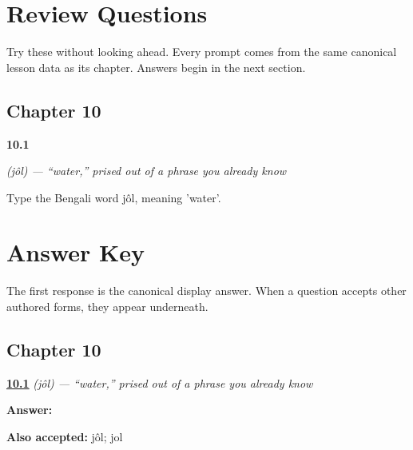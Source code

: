 
\chapter*{Review Questions}

Try these without looking ahead. Every prompt comes from the same canonical lesson data as its chapter. Answers begin in the next section.

\section*{Chapter 10}

\noindent\begin{minipage}[t]{\linewidth}
\raggedright
\hypertarget{review-BN-C10-jol-water}{\textbf{10.1}} \emph{ (jôl) — \textquotedblleft{}water,\textquotedblright{} prised out of a phrase you already know}\par
\small Type the Bengali word jôl, meaning 'water'.
\end{minipage}\par\medskip

\chapter*{Answer Key}

The first response is the canonical display answer. When a question accepts other authored forms, they appear underneath.

\section*{Chapter 10}

\noindent\begin{minipage}[t]{\linewidth}
\raggedright
\hyperlink{review-BN-C10-jol-water}{\textbf{10.1}} \emph{ (jôl) — \textquotedblleft{}water,\textquotedblright{} prised out of a phrase you already know}\par
\small \textbf{Answer:} \par
\footnotesize \textbf{Also accepted:} jôl; jol
\end{minipage}\par\medskip
